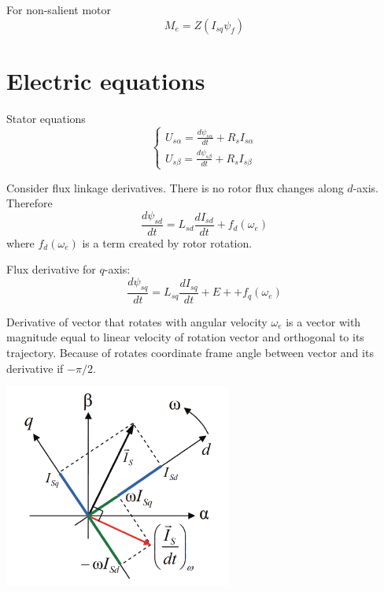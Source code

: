 \documentclass[11pt,a4paper,oneside]{report}
\begin{document}
For non-salient motor
\begin{equation}
	M_e=Z(I_{sq}\psi_f)
\end{equation}

\section{Electric equations}

Stator equations
\begin{equation}
	\left\{
	\begin{split}
		U_{s\alpha} = \frac{d\psi_{s\alpha}}{dt}+R_sI_{s\alpha}\\
		U_{s\beta} = \frac{d\psi_{s\beta}}{dt}+R_sI_{s\beta}
	\end{split}
	\right.
\end{equation}

Consider flux linkage derivatives. There is no rotor flux changes along $d$-axis. Therefore
\begin{equation}
	\frac{d\psi_{sd}}{dt}=L_{sd}\frac{dI_{sd}}{dt}+f_d(\omega_e)
\end{equation}
where $f_d(\omega_e)$ is a term created by rotor rotation.

Flux derivative for $q$-axis:
\begin{equation}
	\frac{d\psi_{sq}}{dt}=L_{sq}\frac{dI_{sq}}{dt}+E++f_q(\omega_e)
\end{equation}

Derivative of vector that rotates with angular velocity $\omega_e$ is a vector with magnitude equal to linear velocity of rotation vector and orthogonal to its trajectory. Because of rotates coordinate frame angle between vector and its derivative if $-\pi/2$.

\begin{center}
	\includegraphics[scale=1]{vec_der}
\end{center}
\end{document}
